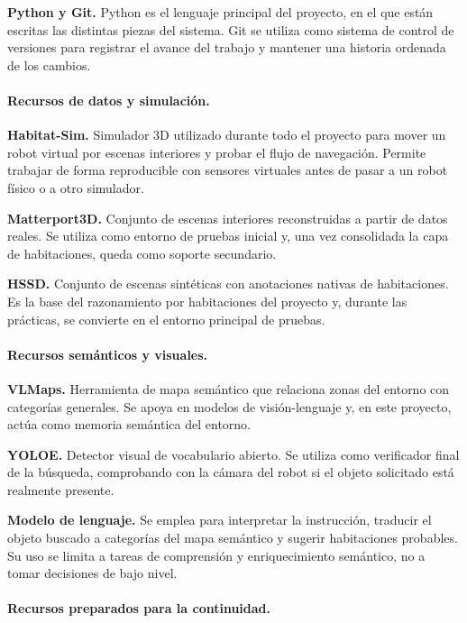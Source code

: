 \documentclass[11pt,fleqn,openany]{book} %
\begin{document}
\textbf{Python y Git.} Python es el lenguaje principal del proyecto, en el que están escritas las distintas piezas del sistema. Git se utiliza como sistema de control de versiones para registrar el avance del trabajo y mantener una historia ordenada de los cambios.

\paragraph{Recursos de datos y simulación.}

\textbf{Habitat-Sim.} Simulador 3D utilizado durante todo el proyecto para mover un robot virtual por escenas interiores y probar el flujo de navegación. Permite trabajar de forma reproducible con sensores virtuales antes de pasar a un robot físico o a otro simulador.

\textbf{Matterport3D.} Conjunto de escenas interiores reconstruidas a partir de datos reales. Se utiliza como entorno de pruebas inicial y, una vez consolidada la capa de habitaciones, queda como soporte secundario.

\textbf{HSSD.} Conjunto de escenas sintéticas con anotaciones nativas de habitaciones. Es la base del razonamiento por habitaciones del proyecto y, durante las prácticas, se convierte en el entorno principal de pruebas.

\paragraph{Recursos semánticos y visuales.}

\textbf{VLMaps.} Herramienta de mapa semántico que relaciona zonas del entorno con categorías generales. Se apoya en modelos de visión-lenguaje y, en este proyecto, actúa como memoria semántica del entorno.

\textbf{YOLOE.} Detector visual de vocabulario abierto. Se utiliza como verificador final de la búsqueda, comprobando con la cámara del robot si el objeto solicitado está realmente presente.

\textbf{Modelo de lenguaje.} Se emplea para interpretar la instrucción, traducir el objeto buscado a categorías del mapa semántico y sugerir habitaciones probables. Su uso se limita a tareas de comprensión y enriquecimiento semántico, no a tomar decisiones de bajo nivel.

\paragraph{Recursos preparados para la continuidad.}
\end{document}
